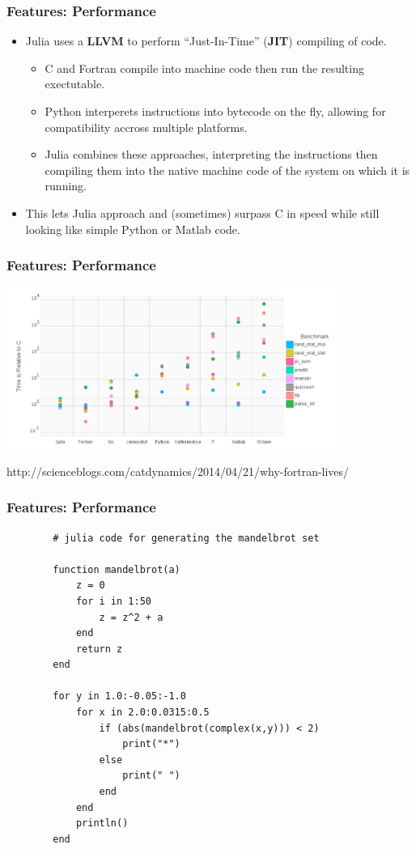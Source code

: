 \documentclass{beamer}
\begin{document}
\begin{frame}
	\frametitle{Features: Performance}

	\begin{itemize}
		\item Julia uses a \textbf{LLVM} to perform ``Just-In-Time'' (\textbf{JIT}) compiling of code. \newline

		\begin{itemize}
			\item C and Fortran compile into machine code then run the resulting exectutable. \newline

			\item Python interperets instructions into bytecode on the fly, allowing for compatibility accross multiple platforms. \newline

			\item Julia combines these approaches, interpreting the instructions then compiling them into the native machine code of the system on which it is running. \newline
		\end{itemize}

		\item This lets Julia approach and (sometimes) surpass C in speed while still looking like simple Python or Matlab code.
	\end{itemize}
\end{frame}

\begin{frame}
	\frametitle{Features: Performance}

	\includegraphics[width=11cm]{Images/perf1.jpg} \newline

	\small http://scienceblogs.com/catdynamics/2014/04/21/why-fortran-lives/
\end{frame}

\begin{frame}[fragile]
	\frametitle{Features: Performance}

	\small \begin{verbatim}
		# julia code for generating the mandelbrot set

		function mandelbrot(a)
		    z = 0
		    for i in 1:50
		        z = z^2 + a
		    end
		    return z
		end

		for y in 1.0:-0.05:-1.0
		    for x in 2.0:0.0315:0.5
		        if (abs(mandelbrot(complex(x,y))) < 2)
		            print("*")
		        else
		            print(" ")
		        end
		    end
		    println()
		end
	\end{verbatim}
\end{frame}
\end{document}
